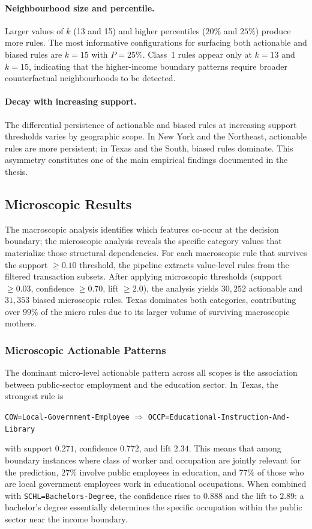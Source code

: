 \paragraph{Neighbourhood size and percentile.} Larger values of $k$ (13 and 15) and higher percentiles ($20\%$ and $25\%$) produce more rules. The most informative configurations for surfacing both actionable and biased rules are $k = 15$ with $P = 25\%$. Class~1 rules appear only at $k = 13$ and $k = 15$, indicating that the higher-income boundary patterns require broader counterfactual neighbourhoods to be detected.

\paragraph{Decay with increasing support.} The differential persistence of actionable and biased rules at increasing support thresholds varies by geographic scope. In New York and the Northeast, actionable rules are more persistent; in Texas and the South, biased rules dominate. This asymmetry constitutes one of the main empirical findings documented in the thesis.

\subsection{Microscopic Results}
\label{sec:micro-results}

The macroscopic analysis identifies which features co-occur at the decision boundary; the microscopic analysis reveals the specific category values that materialize those structural dependencies. For each macroscopic rule that survives the support $\geq 0.10$ threshold, the pipeline extracts value-level rules from the filtered transaction subsets. After applying microscopic thresholds (support $\geq 0.03$, confidence $\geq 0.70$, lift $\geq 2.0$), the analysis yields $30{,}252$ actionable and $31{,}353$ biased microscopic rules. Texas dominates both categories, contributing over $99\%$ of the micro rules due to its larger volume of surviving macroscopic mothers.

\subsubsection{Microscopic Actionable Patterns}

The dominant micro-level actionable pattern across all scopes is the association between public-sector employment and the education sector. In Texas, the strongest rule is
\begin{center}
\texttt{COW=Local-Government-Employee} $\Rightarrow$ \texttt{OCCP=Educational-Instruction-And-Library}
\end{center}
with support $0.271$, confidence $0.772$, and lift $2.34$. This means that among boundary instances where class of worker and occupation are jointly relevant for the prediction, $27\%$ involve public employees in education, and $77\%$ of those who are local government employees work in educational occupations. When combined with \texttt{SCHL=Bachelors-Degree}, the confidence rises to $0.888$ and the lift to $2.89$: a bachelor's degree essentially determines the specific occupation within the public sector near the income boundary.

